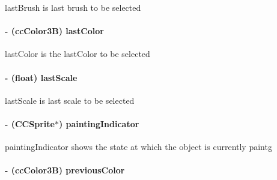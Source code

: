 last\-Brush is last brush to be selected \hypertarget{interface_h_u_d_layer_a2d27bf64876ea6f0b2f0d1b9013c1cd7}{
\paragraph[{last\-Color}]{\setlength{\rightskip}{0pt plus 5cm}-\/ (cc\-Color3\-B) last\-Color\hspace{0.3cm}{\ttfamily [protected]}}}\label{d3/d8a/interface_h_u_d_layer_a2d27bf64876ea6f0b2f0d1b9013c1cd7}
last\-Color is the last\-Color to be selected \hypertarget{interface_h_u_d_layer_aedd1d8d2b2d31e203c3242d09390b561}{
\paragraph[{last\-Scale}]{\setlength{\rightskip}{0pt plus 5cm}-\/ (float) last\-Scale\hspace{0.3cm}{\ttfamily [protected]}}}\label{d3/d8a/interface_h_u_d_layer_aedd1d8d2b2d31e203c3242d09390b561}
last\-Scale is last scale to be selected \hypertarget{interface_h_u_d_layer_a67d356e56a82f871b6c5de5818c5985d}{
\paragraph[{painting\-Indicator}]{\setlength{\rightskip}{0pt plus 5cm}-\/ (C\-C\-Sprite$\ast$) painting\-Indicator\hspace{0.3cm}{\ttfamily [protected]}}}\label{d3/d8a/interface_h_u_d_layer_a67d356e56a82f871b6c5de5818c5985d}
painting\-Indicator shows the state at which the object is currently paintg \hypertarget{interface_h_u_d_layer_a2b737d7aa3b728dd3d5990ef4cb68f29}{
\paragraph[{previous\-Color}]{\setlength{\rightskip}{0pt plus 5cm}-\/ (cc\-Color3\-B) previous\-Color\hspace{0.3cm}{\ttfamily [protected]}}}\label{d3/d8a/interface_h_u_d_layer_a2b737d7aa3b728dd3d5990ef4cb68f29}

